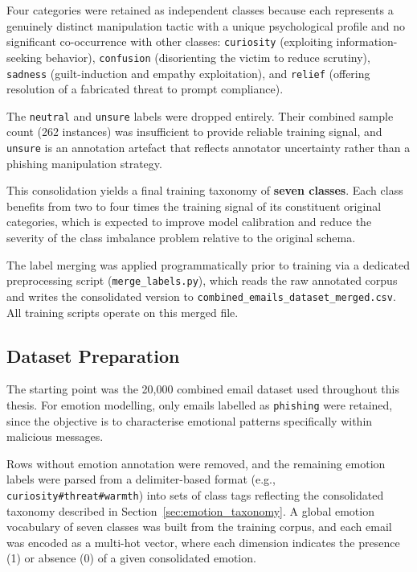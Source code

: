 Four categories were retained as independent classes because each represents a genuinely distinct manipulation tactic with a unique psychological profile and no significant co-occurrence with other classes: \texttt{curiosity} (exploiting information-seeking behavior), \texttt{confusion} (disorienting the victim to reduce scrutiny), \texttt{sadness} (guilt-induction and empathy exploitation), and \texttt{relief} (offering resolution of a fabricated threat to prompt compliance).

The \texttt{neutral} and \texttt{unsure} labels were dropped entirely. Their combined sample count (262 instances) was insufficient to provide reliable training signal, and \texttt{unsure} is an annotation artefact that reflects annotator uncertainty rather than a phishing manipulation strategy.

This consolidation yields a final training taxonomy of \textbf{seven classes}. Each class benefits from two to four times the training signal of its constituent original categories, which is expected to improve model calibration and reduce the severity of the class imbalance problem relative to the original schema.

The label merging was applied programmatically prior to training via a dedicated preprocessing script (\texttt{merge\_labels.py}), which reads the raw annotated corpus and writes the consolidated version to \texttt{combined\_emails\_dataset\_merged.csv}. All training scripts operate on this merged file.

\subsection{Dataset Preparation}

The starting point was the 20,000 combined email dataset used throughout this thesis. For emotion modelling, only emails labelled as \texttt{phishing} were retained, since the objective is to characterise emotional patterns specifically within malicious messages.

Rows without emotion annotation were removed, and the remaining emotion labels were parsed from a delimiter-based format (e.g., \texttt{curiosity\#threat\#warmth}) into sets of class tags reflecting the consolidated taxonomy described in Section~\ref{sec:emotion_taxonomy}. A global emotion vocabulary of seven classes was built from the training corpus, and each email was encoded as a multi-hot vector, where each dimension indicates the presence (1) or absence (0) of a given consolidated emotion.

